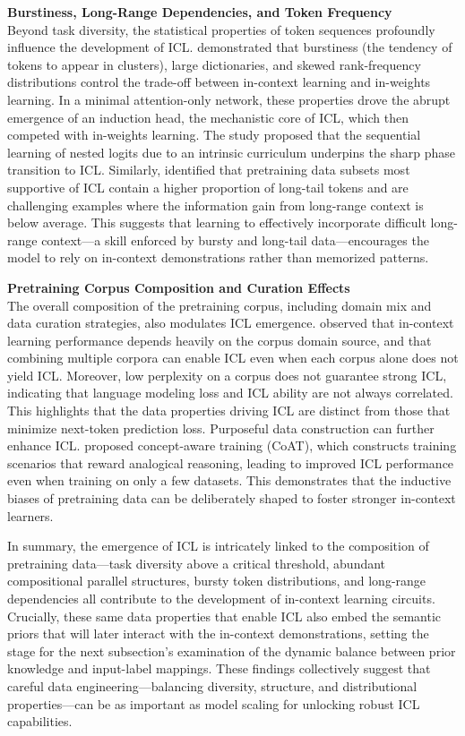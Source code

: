 \documentclass[11pt]{article}
\begin{document}
\textbf{Burstiness, Long-Range Dependencies, and Token Frequency}\\
Beyond task diversity, the statistical properties of token sequences profoundly influence the development of ICL. \cite{ref35} demonstrated that burstiness (the tendency of tokens to appear in clusters), large dictionaries, and skewed rank-frequency distributions control the trade-off between in-context learning and in-weights learning. In a minimal attention-only network, these properties drove the abrupt emergence of an induction head, the mechanistic core of ICL, which then competed with in-weights learning. The study proposed that the sequential learning of nested logits due to an intrinsic curriculum underpins the sharp phase transition to ICL. Similarly, \cite{ref36} identified that pretraining data subsets most supportive of ICL contain a higher proportion of long-tail tokens and are challenging examples where the information gain from long-range context is below average. This suggests that learning to effectively incorporate difficult long-range context---a skill enforced by bursty and long-tail data---encourages the model to rely on in-context demonstrations rather than memorized patterns.

\textbf{Pretraining Corpus Composition and Curation Effects}\\
The overall composition of the pretraining corpus, including domain mix and data curation strategies, also modulates ICL emergence. \cite{ref37} observed that in-context learning performance depends heavily on the corpus domain source, and that combining multiple corpora can enable ICL even when each corpus alone does not yield ICL. Moreover, low perplexity on a corpus does not guarantee strong ICL, indicating that language modeling loss and ICL ability are not always correlated. This highlights that the data properties driving ICL are distinct from those that minimize next-token prediction loss. Purposeful data construction can further enhance ICL. \cite{ref38} proposed concept-aware training (CoAT), which constructs training scenarios that reward analogical reasoning, leading to improved ICL performance even when training on only a few datasets. This demonstrates that the inductive biases of pretraining data can be deliberately shaped to foster stronger in-context learners.

In summary, the emergence of ICL is intricately linked to the composition of pretraining data---task diversity above a critical threshold, abundant compositional parallel structures, bursty token distributions, and long-range dependencies all contribute to the development of in-context learning circuits. Crucially, these same data properties that enable ICL also embed the semantic priors that will later interact with the in-context demonstrations, setting the stage for the next subsection's examination of the dynamic balance between prior knowledge and input-label mappings. These findings collectively suggest that careful data engineering---balancing diversity, structure, and distributional properties---can be as important as model scaling for unlocking robust ICL capabilities.
\end{document}

